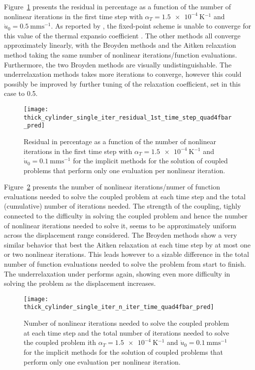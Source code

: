 Figure~\ref{fig:thick_cylinder_single_iter_residual_1st_time_step_quad4fbar_pred} presents the residual in percentage as a function of the number of nonlinear iterations in the first time step with \(\alpha_T=\SI{1.5e-4}{\kelvin^{-1}}\) and \(\dot u_0 =\SI{0.5}{\milli\meter\second^{-1}}\).
As reported by \cite{erbts_accelerated_2012}, the fixed-point scheme is unable to converge for this value of the thermal expansio coefficient .
The other methods all converge approximately linearly, with the Broyden methods and the Aitken relaxation method taking the same number of nonlinear iterations/function evaluations.
Furthermore, the two Broyden methods are visually undistinguishable.
The underrelaxation methods takes more iterations to converge, however this could possibly be improved by further tuning of the relaxation coefficient, set in this case to 0.5.

\begin{figure}[htbp]
  \texttt{[image: thick\_cylinder\_single\_iter\_residual\_1st\_time\_step\_quad4fbar\_pred]}
  \caption{Residual in percentage as a function of the number of nonlinear iterations in the first time step with \(\alpha_T=\SI{1.5e-4}{\kelvin^{-1}}\) and \(\dot u_0 =\SI{0.1}{\milli\meter\second^{-1}}\) for the implicit methods for the solution of coupled problems that perform only one evaluation per nonlinear iteration.}
\label{fig:thick_cylinder_single_iter_residual_1st_time_step_quad4fbar_pred}
\end{figure}

Figure~\ref{fig:thick_cylinder_single_iter_n_iter_time_quad4fbar_pred} presents the number of nonlinear iterations/numer of function evaluations needed to solve the coupled problem at each time step and the total (cumulative) number of iterations needed.
The strength of the coupling, tighly connected to the difficulty in solving the coupled problem and hence the number of nonlinear iterations needed to solve it, seems to be approximately uniform across the displacement range considered.
The Broyden methods show a very similar behavior that best the Aitken relaxation at each time step by at most one or two nonlinear iterations.
This leads however to a sizable difference in the total number of function evaluations needed to solve the problem from start to finish.
The underrelaxation under performs again, showing even more difficulty in solving the problem as the displacement increases.

\begin{figure}[htbp]
  \texttt{[image: thick\_cylinder\_single\_iter\_n\_iter\_time\_quad4fbar\_pred]}
  \caption{Number of nonlinear iterations needed to solve the coupled problem at each time step and the total number of iterations needed to solve the coupled problem ith \(\alpha_T=\SI{1.5e-4}{\kelvin^{-1}}\) and \(\dot u_0 =\SI{0.1}{\milli\meter\second^{-1}}\) for the implicit methods for the solution of coupled problems that perform only one evaluation per nonlinear iteration.}
\label{fig:thick_cylinder_single_iter_n_iter_time_quad4fbar_pred}
\end{figure}

